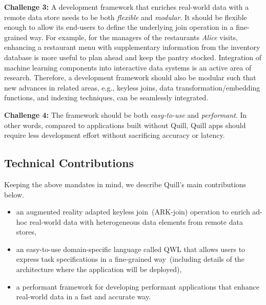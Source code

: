 \documentclass[11pt]{article}
\begin{document}
\newcommand{\challengecustom}{3}
\textbf{Challenge 3: } A development framework that enriches real-world data with a remote data store needs to be both \textit{flexible} and \textit{modular}. It should be flexible enough to allow its end-users to define the underlying join operation in a fine-grained way.
For example, for the managers of the restaurants \textit{Alice} visits, enhancing a restaurant menu with supplementary information from the inventory database is more useful to plan ahead and keep the pantry stocked.
Integration of machine learning components into interactive data systems is an active area of research. Therefore, a development framework should also be modular such that new advances in related areas, e.g., keyless joins, data transformation/embedding functions, and indexing techniques, can be seamlessly integrated.\vspace{0.07cm} 

\newcommand{\challengeperform}{4}
\textbf{Challenge 4: }
The framework should be both \textit{easy-to-use} and \textit{performant}. In other words, compared to applications built without Quill, Quill apps should require less development effort without sacrificing accuracy or latency. 

\subsection{Technical Contributions}
Keeping the above mandates in mind, we describe Quill's main contributions below.

\begin{itemize}
    
	\item an augmented reality adapted keyless join~(ARK-join) operation to enrich ad-hoc real-world data with heterogeneous data elements from remote data stores,
	
	\item an easy-to-use domain-specific language called QWL that allows users to express task specifications in a fine-grained way~(including details of the architecture where the application will be deployed),
	
	\item a performant framework for developing performant applications that enhance real-world data in a fast and accurate way.
	
\end{itemize}
\end{document}

